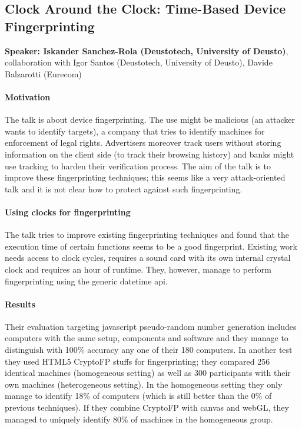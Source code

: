 \documentclass{article}
\begin{document}
\subsection{Clock Around the Clock: Time-Based Device Fingerprinting}
\noindent\textbf{Speaker: Iskander Sanchez-Rola (Deustotech, University of Deusto)}, collaboration with Igor Santos (Deustotech, University of Deusto), Davide Balzarotti (Eurecom)

\paragraph{Motivation} The talk is about device fingerprinting. The use might be malicious (an attacker wants to identify targets), a company that tries to identify machines for enforcement of legal rights. Advertisers moreover track users without storing information on the client side (to track their browsing history) and banks might use tracking to harden their verification process. The aim of the talk is to improve these fingerprinting techniques; this seems like a very attack-oriented talk and it is not clear how to protect against such fingerprinting. 

\paragraph{Using clocks for fingerprinting} The talk tries to improve existing fingerprinting techniques and found that the execution time of certain functions seems to be a good fingerprint. Existing work needs access to clock cycles, requires a sound card with its own internal crystal clock and requires an hour of runtime. They, however, manage to perform fingerprinting using the generic datetime api.

\paragraph{Results} Their evaluation targeting javascript pseudo-random number generation includes computers with the same setup, components and software and they manage to distinguish with 100\% accuracy any one of their 180 computers.
In another test they used HTML5 CryptoFP stuffs for fingerprinting; they compared 256 identical machines (homogeneous setting) as well as 300 participants with their own machines (heterogeneous setting). In the homogeneous setting they only manage to identify 18\% of computers (which is still better than the 0\% of previous techniques). If they combine CryptoFP with canvas and webGL, they managed to uniquely identify 80\% of machines in the homogeneous group.
\end{document}
